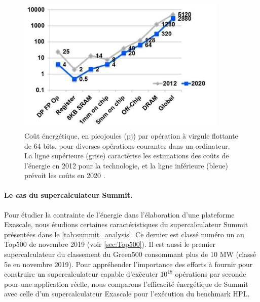             \begin{figure}
            \center
            \includegraphics[width=10cm]{images/energy_pj.png}
            \caption{\label{fig:energy_pj} Coût énergétique, en picojoules (pj) par opération à virgule flottante de 64 bits, pour diverses opérations courantes dans un ordinateur. La ligne supérieure (grise) caractérise les estimations des coûts de l'énergie en 2012 pour la technologie, et la ligne inférieure (bleue) prévoit les coûts en 2020 \cite{Leland2014}.}
            \end{figure}
            
                

        
        \paragraph{Le cas du supercalculateur Summit.} 
        
            Pour étudier la contrainte de l'énergie dans l'élaboration d'une plateforme Exascale, nous étudions certaines caractéristiques du supercalculateur Summit présentées dans le \autoref{tab:summit_analysis}. Ce dernier est classé numéro un au Top500 de novembre 2019 (voir \autoref{sec:Top500}). Il est aussi le premier supercalculateur du classement du Green500 consommant plus de 10 MW  (classé 5e en novembre 2019). Pour appréhender l'importance des efforts à fournir pour construire un supercalculateur capable d'exécuter $10^{18}$ opérations par seconde pour une application réelle, nous comparons l'efficacité énergétique de Summit avec celle d'un supercalculateur Exascale pour l'exécution du benchmark HPL.
        
